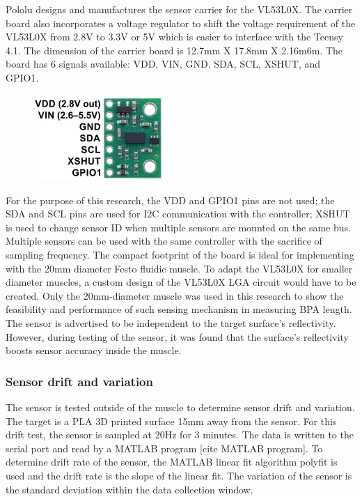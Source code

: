 \documentclass[letterpaper,11pt]{article}
\begin{document}
Pololu designs and manufactures the sensor carrier for the VL53L0X.  The carrier board also incorporates a voltage regulator to shift the voltage requirement of the VL53L0X from 2.8V to 3.3V or 5V which is easier to interface with the Teensy 4.1. The dimension of the carrier board is 12.7mm X 17.8mm X 2.16m6m. The board has 6 signals available: VDD, VIN, GND, SDA, SCL, XSHUT, and GPIO1.

\begin{figure}[h]
\includegraphics[width=5cm]{chip}
\centering
\end{figure}

For the purpose of this research, the VDD and GPIO1 pins are not used; the SDA and SCL pins are used for I2C communication with the controller; XSHUT is used to change sensor ID when multiple sensors are mounted on the same bus. Multiple sensors can be used with the same controller with the sacrifice of sampling frequency. The compact footprint of the board is ideal for implementing with the 20mm diameter Festo fluidic muscle. To adapt the VL53L0X for smaller diameter muscles, a custom design of the VL53L0X LGA circuit would have to be created. Only the 20mm-diameter muscle was used in this research to show the feasibility and performance of such sensing mechanism in measuring BPA length.\\

The sensor is advertised to be independent to the target surface’s reflectivity. However, during testing of the sensor, it was found that the surface’s reflectivity boosts sensor accuracy inside the muscle.

\subsubsection{Sensor drift and variation}

The sensor is tested outside of the muscle to determine sensor drift and variation. The target is a PLA 3D printed surface 15mm away from the sensor. For this drift test, the sensor is sampled at 20Hz for 3 minutes. The data is written to the serial port and read by a MATLAB program [cite MATLAB program]. To determine drift rate of the sensor, the MATLAB linear fit algorithm polyfit is used and the drift rate is the slope of the linear fit. The variation of the sensor is the standard deviation within the data collection window.
\end{document}
